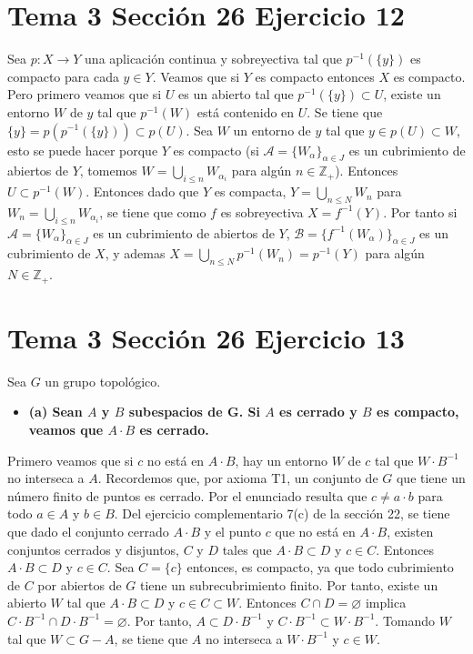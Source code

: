 \documentclass{article}
\begin{document}
\section{Tema 3 Sección 26 Ejercicio 12}
Sea $p:X\rightarrow Y$ una aplicación continua y sobreyectiva tal que $p^{-1}(\{y\})$ es compacto para cada $y\in Y$. Veamos que si $Y$ es compacto entonces $X$ es compacto. Pero primero veamos que si $U$ es un abierto tal que $p^{-1}(\{y\})\subset U$, existe un entorno $W$ de $y$ tal que $p^{-1}(W)$ está contenido en $U$. Se tiene que $\{y\}=p(p^{-1}(\{y\}))\subset p(U)$. Sea $W$ un entorno de $y$ tal que $y\in p(U)\subset W$, esto se puede hacer porque $Y$ es compacto (si $\mathcal{A}=\{W_\alpha\}_{\alpha\in J}$ es un cubrimiento de abiertos de $Y$, tomemos  $W=\bigcup_{i\leq n}W_{\alpha_i}$ para algún $n\in\mathbb{Z}_+$). Entonces $U\subset p^{-1}(W)$.  Entonces dado que $Y$ es compacta, $Y=\bigcup_{n\leq N}W_n$ para $W_n=\bigcup_{i\leq n}W_{\alpha_i}$, se tiene que como $f$ es sobreyectiva $X=f^{-1}(Y)$. Por tanto si $\mathcal{A}=\{W_\alpha\}_{\alpha\in J}$ es un cubrimiento de abiertos de $Y$, $\mathcal{B}=\{f^{-1}(W_\alpha)\}_{\alpha\in J}$ es un cubrimiento de $X$, y ademas $X=\bigcup_{n\leq N}p^{-1}(W_n)=p^{-1}(Y)$ para algún $N\in\mathbb{Z}_+$.
\section{Tema 3 Sección 26 Ejercicio 13}
Sea $G$ un grupo topológico.
\begin{itemize}
\item \bf (a) \rm Sean $A$ y $B$ subespacios de G. Si $A$ es cerrado y $B$ es compacto, veamos que $A\cdot B$ es cerrado.
\end{itemize}
Primero veamos que si $c$ no está en $A\cdot B$, hay un entorno $W$ de $c$ tal que $W\cdot B^{-1}$ no interseca a $A$. Recordemos que, por axioma T1, un conjunto de $G$ que tiene un número finito de puntos es cerrado. Por el enunciado resulta que $c\neq a\cdot b$ para todo $a\in A$ y  $b\in B$. Del ejercicio complementario 7(c) de la sección 22, se tiene que dado el conjunto cerrado $A\cdot B$ y el punto $c$ que no está en $A\cdot B$, existen conjuntos cerrados y disjuntos, $C$ y $D$ tales que $A\cdot B\subset D$ y $c\in C$. Entonces $A\cdot B\subset D$ y $c\in C$. Sea $C=\{c\}$ entonces, es compacto, ya que todo cubrimiento de $C$ por abiertos de $G$ tiene un subrecubrimiento finito. Por tanto, existe un abierto $W$ tal que $A\cdot B\subset D$ y $c\in C\subset W$. Entonces $C\cap D= \varnothing$ implica $C\cdot B^{-1}\cap D\cdot B^{-1}= \varnothing$. Por tanto, $A\subset D\cdot B^{-1}$ y $C\cdot B^{-1}\subset W\cdot B^{-1}$. Tomando $W$ tal que $W\subset G-A$, se tiene que $A$ no interseca a $W\cdot B^{-1}$ y $c\in W$.
\end{document}
